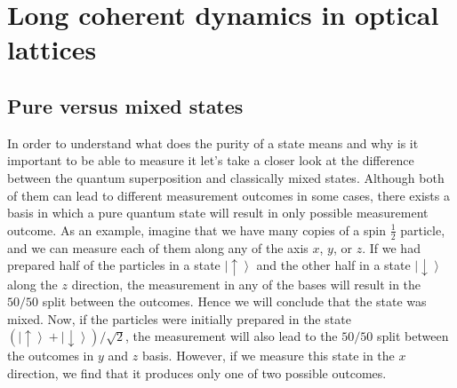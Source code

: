 \chapter{Long coherent dynamics in optical lattices}

\section{Pure versus mixed states}
In order to understand what does the purity of a state means and why is it important to be able to measure it let's take a closer look at the difference between the quantum superposition and classically mixed states. Although both of them can lead to different measurement outcomes in some cases, there exists a basis in which a pure quantum state will result in only possible measurement outcome. As an example, imagine that we have many copies of a spin $\frac{1}{2}$ particle, and we can measure each of them along any of the axis $x$, $y$, or $z$. If we had prepared half of the particles in a state $\left| \uparrow \right>$ and the other half in a state $\left| \downarrow \right>$ along the $z$ direction, the measurement in any of the bases will result in the $50/50$ split between the outcomes. Hence we will conclude that the state was mixed. Now, if the particles were initially prepared in the state $(\left| \uparrow  \right>+ \left| \downarrow \right>)/\sqrt{2}$, the measurement will also lead to the $50/50$ split between the outcomes in $y$ and $z$ basis. However, if we measure this state in the $x$ direction, we find that it produces only one of two possible outcomes. 

